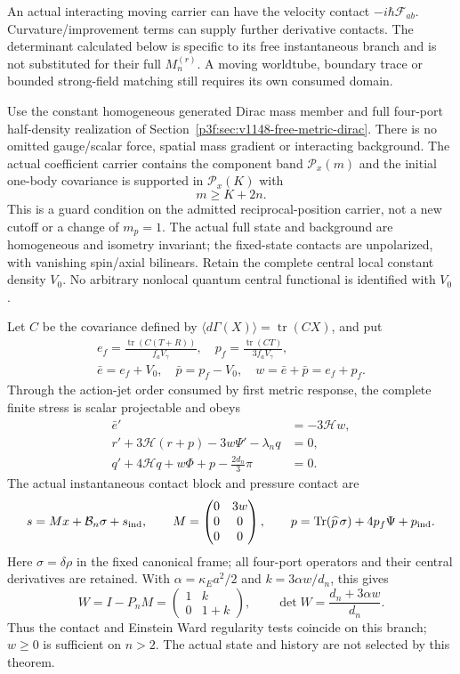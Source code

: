 \documentclass[12pt,a4paper]{article}
\begin{document}
An actual interacting moving carrier can have the velocity contact
$-i\hbar\mathcal F_{ab}$. Curvature/improvement terms can supply further
derivative contacts. The determinant calculated below is specific to its
free instantaneous branch and is not substituted for their full
$M_n^{(r)}$. A moving worldtube, boundary trace or bounded strong-field
matching still requires its own consumed domain.

\begin{theorem}
\label{p8:thm:v2149-guarded-free-metric-ward}
Use the constant homogeneous generated Dirac mass member and full
four-port half-density realization of
Section~\ref{p3f:sec:v1148-free-metric-dirac}. There is no omitted
gauge/scalar force, spatial mass gradient or interacting background.
The actual coefficient carrier contains the component band
$\mathcal P_x(m)$ and the initial one-body covariance is supported in
$\mathcal P_x(K)$ with
\[
 m\ge K+2n.
\]
This is a guard condition on the admitted reciprocal-position carrier,
not a new cutoff or a change of $m_p=1$.
The actual full state and background are homogeneous and isometry invariant;
the fixed-state contacts are unpolarized, with vanishing spin/axial
bilinears. Retain the complete central local constant density $V_0$.
No arbitrary nonlocal quantum central functional is identified with $V_0$.

Let $C$ be the covariance defined by
$\langle d\Gamma(X)\rangle=\operatorname{tr}(CX)$, and put
\[
 \begin{gathered}
 e_f=\frac{\operatorname{tr}(C(T+R))}{f_aV_\gamma},\quad
 p_f=\frac{\operatorname{tr}(CT)}{3f_aV_\gamma},\\
 \bar e=e_f+V_0,\quad \bar p=p_f-V_0,\quad w=\bar e+\bar p=e_f+p_f.
 \end{gathered}
\]
Through the action-jet order consumed by first metric response, the complete
finite stress is scalar projectable and obeys
\begin{align*}
 \bar e'&=-3\mathcal Hw,\\
 r'+3\mathcal H(r+p)-3w\Psi'-\lambda_nq&=0,\\
 q'+4\mathcal Hq+w\Phi+p-\frac{2d_n}{3}\pi&=0.
\end{align*}
The actual instantaneous contact block and pressure contact are
\[
 s=Mx+\mathcal B_n\sigma+s_{\rm ind},\qquad
 M=\begin{pmatrix}0&3w\\0&0\\0&0\end{pmatrix},\qquad
 p=\operatorname{Tr}(\widehat p\,\sigma)+4p_f\Psi+p_{\rm ind}.
\]
Here $\sigma=\delta\rho$ in the fixed canonical frame; all four-port
operators and their central derivatives are retained.
With $\alpha=\kappa_Ea^2/2$ and $k=3\alpha w/d_n$, this gives
\[
 W=I-P_nM=\begin{pmatrix}1&k\\0&1+k\end{pmatrix},\qquad
 \det W=\frac{d_n+3\alpha w}{d_n}.
\]
Thus the contact and Einstein Ward regularity tests coincide on this branch;
$w\ge0$ is sufficient on $n>2$. The actual state and history are not
selected by this theorem.
\end{theorem}
\end{document}
